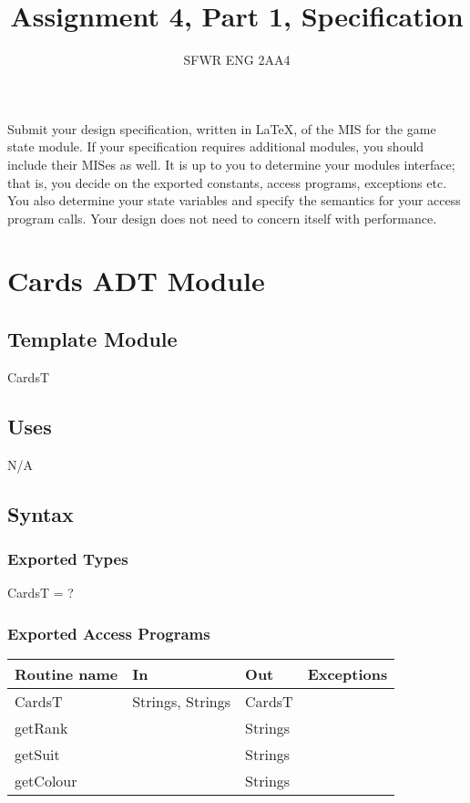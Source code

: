 \documentclass[12pt]{article}
\title{Assignment 4, Part 1, Specification}
\author{SFWR ENG 2AA4}
\begin{document}
\maketitle

Submit your design specification, written in LaTeX, of the MIS for the game
state module.  If your specification requires additional modules, you should
include their MISes as well.  It is up to you to determine your modules
interface; that is, you decide on the exported constants, access programs,
exceptions etc.  You also determine your state variables and specify the
semantics for your access program calls.  Your design does not need to concern
itself with performance.


\newpage


\section* {Cards ADT Module}

\subsection*{Template Module}

CardsT

\subsection* {Uses}

N/A

\subsection* {Syntax}

\subsubsection* {Exported Types}

CardsT = ?

\subsubsection* {Exported Access Programs}

\begin{tabular}{| l | l | l | l |}
\hline
\textbf{Routine name} & \textbf{In} & \textbf{Out} & \textbf{Exceptions}\\
\hline
CardsT & Strings, Strings & CardsT & \\
\hline
getRank & ~ & Strings & ~\\
\hline
getSuit & ~ & Strings & ~\\
\hline
getColour & ~ & Strings & ~\\
\hline
\end{tabular}
\end{document}
